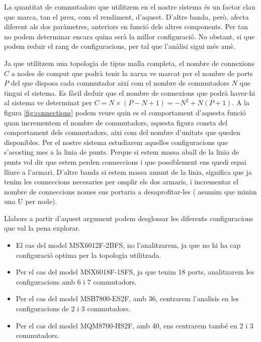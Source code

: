 La quantitat de commutadors que utilitzem en el nostre sistema és un factor clau que marca,
tan el preu, com el rendiment, d'aquest. D'altre banda, però, afecta diferent als dos paràmetres,
anteriors en funció dels altres components. Per tan no podem determinar encara quina serà la
millor configuració. No obstant, si que podem reduir el rang de configuracions, per tal que
l'anàlisi sigui més amè.

Ja que utilitzem una topologia de tipus malla completa, el nombre de connexions $C$ a nodes de comput
que podrà tenir la xarxa ve marcat per el nombre de ports $P$ del que disposa cada commutador així
com el nombre de commutadors $N$ que tingui el sistema. Es fàcil deduir que el nombre de connexions
que podrà haver-hi al sistema ve determinat per $C = N \times ( P - N + 1 ) = -N^2 + N(P+1)$.
A la figura \ref{fig:connections} podem veure quin es el comportament d'aquesta funció quan incrementem
el nombre de commutadors, aquesta figura consta del comportament dels commutadors, aixi com del nombre 
d'unitats que queden disponibles. Per el nostre sistema estudiarem aquelles configuracions que s'acosting 
mes a la linia de punts. Perque si estem massa aball de la linia de punts vol dir que estem perden conneccions
i que possiblement ens quedi espai lliure a l'armari. D'altre banda si estem massa amunt de la linia, 
significa que ja tenim les conneccions necesaries per omplir els dos armaris, i incrementar el nombre de conneccions
nomes ens portaria a desaprofitar-les ( asumim que minim una U per node).

Llabors a partir d'aquest argument podem desglossar les diferents configuracions que val la pena explorar.
\begin{itemize}
  \item El cas del model MSX6012F-2BFS, no l'analitzarem, ja que no hi ha cap configuració optima per la topologia utilitzada.
  \item Per el cas del model MSX6018F-1SFS, ja que tenim 18 ports, analitzarem les configuracions amb 6 i 7 commutadors.
  \item Per el cas del model MSB7800-ES2F, amb 36, centrarem l'analisis en les configuracions de 2 i 3 commutadors.
  \item Per el cas del model MQM8700-HS2F, amb 40, ens centrarem també en 2 i 3 commutadors.
\end{itemize}

